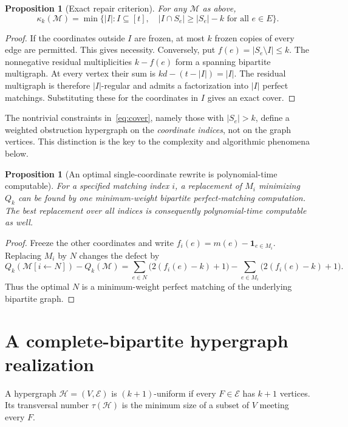 \documentclass[10pt]{article}
\newtheorem{proposition}[theorem]{Proposition}
\newcommand{\M}{\mathcal M}
\newcommand{\Hh}{\mathcal H}
\newcommand{\kc}{\kappa_k}
\begin{document}
\begin{proposition}[Exact repair criterion]\label{prop:repair}
For any $\M$ as above,
\begin{equation}\label{eq:cover}
\kc(\M)=\min\bigl\{|I|:I\subseteq[t],\quad |I\cap S_e|\ge |S_e|-k\text{ for all }e\in E\bigr\}.
\end{equation}
\end{proposition}
\begin{proof}
If the coordinates outside $I$ are frozen, at most $k$ frozen copies of every edge are permitted. This gives necessity. Conversely, put $f(e)=|S_e\setminus I|\le k$. The nonnegative residual multiplicities $k-f(e)$ form a spanning bipartite multigraph. At every vertex their sum is $kd-(t-|I|)=|I|$. The residual multigraph is therefore $|I|$-regular and admits a factorization into $|I|$ perfect matchings. Substituting these for the coordinates in $I$ gives an exact cover.
\end{proof}
The nontrivial constraints in~\eqref{eq:cover}, namely those with $|S_e|>k$, define a weighted obstruction hypergraph on the \emph{coordinate indices}, not on the graph vertices. This distinction is the key to the complexity and algorithmic phenomena below.

\begin{proposition}[An optimal single-coordinate rewrite is polynomial-time computable]
For a specified matching index $i$, a replacement of $M_i$ minimizing $Q_k$ can be found by one minimum-weight bipartite perfect-matching computation. The best replacement over all indices is consequently polynomial-time computable as well.
\end{proposition}
\begin{proof}
Freeze the other coordinates and write $f_i(e)=m(e)-\mathbf1_{e\in M_i}$. Replacing $M_i$ by $N$ changes the defect by
\[Q_k(\M[i\leftarrow N])-Q_k(\M)=\sum_{e\in N}\bigl(2(f_i(e)-k)+1\bigr)-\sum_{e\in M_i}\bigl(2(f_i(e)-k)+1\bigr).\]
Thus the optimal $N$ is a minimum-weight perfect matching of the underlying bipartite graph.\end{proof}

\section{A complete-bipartite hypergraph realization}
A hypergraph $\Hh=(V,\mathcal E)$ is $(k+1)$-uniform if every $F\in\mathcal E$ has $k+1$ vertices. Its transversal number $\tau(\Hh)$ is the minimum size of a subset of $V$ meeting every $F$.
\end{document}
